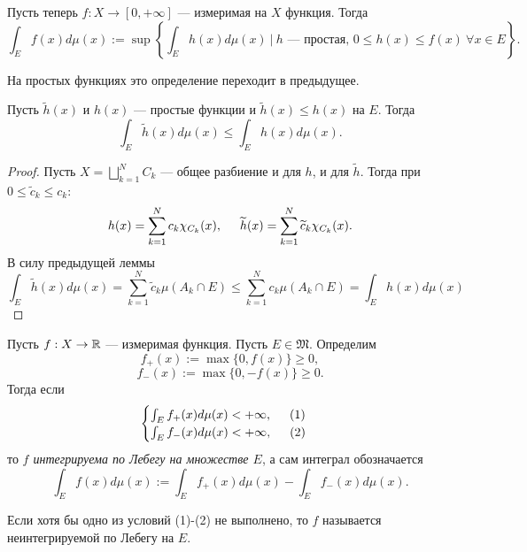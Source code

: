 \begin{definition}
    Пусть теперь $f: X \to [0, +\infty]$ — измеримая на $X$ функция.
    Тогда
    \[\int_E f(x) d\mu(x) := \sup \left\{\int_E h(x) d\mu(x) \ | \ h \text{ — простая, } 0 \leqslant h(x) \leqslant f(x) \ \forall x \in E\right\}.\]
\end{definition} 
\begin{remark}
    На простых функциях это определение переходит в предыдущее.
\end{remark}
\begin{statement}
    Пусть $\widetilde{h}(x)$ и $h(x)$ — простые функции и
    $\widetilde{h}(x) \leqslant h(x)$ на $E$.
    Тогда $$\int_E \widetilde{h}(x) d\mu(x) \leqslant \int_E h(x) d\mu(x).$$
\end{statement} 
\begin{proof}
    Пусть $X = \bigsqcup\limits_{k=1}^{N}C_k$ — общее разбиение и для $h$, и для $\widetilde{h}$.
    Тогда при $0 \leqslant \widetilde{c}_k \leqslant c_k$:
    \[h(x) = \sum\limits_{k=1}^{N} c_k \chi_{C_k}(x), \hspace*{.5cm} \widetilde{h}(x) = \sum\limits_{k=1}^{N} \widetilde{c}_k \chi_{C_k}(x).\]
    В силу предыдущей леммы
    \[\int_E \widetilde{h}(x) d\mu(x) 
    = \sum\limits_{k=1}^{N}\widetilde{c}_k \mu(A_k \cap E)
    \leqslant \sum\limits_{k=1}^{N} c_k \mu(A_k \cap E)
    = \int_E h(x) d\mu(x)\]
\end{proof} 

\begin{definition}
    Пусть $f: X \to \mathbb{R}$ — измеримая функция.
    Пусть $E \in \mathfrak{M}$.
    Определим
    \[f_+(x) := \max\{0, f(x)\} \geqslant 0,\]
    \[f_-(x) := \max\{0, -f(x)\} \geqslant 0.\]
    Тогда если 
    \[\begin{cases}
        \int_E f_+(x) d\mu(x) < +\infty, \hspace*{.5cm} (1)\\
        \int_E f_-(x) d\mu(x) < +\infty, \hspace*{.5cm} (2)
    \end{cases}
    \]
    то \textit{$f$ интегрируема по Лебегу на множестве $E$}, а сам интеграл обозначается
    \[\int_E f(x) d\mu(x) := \int_E f_+(x) d\mu(x) - \int_E f_-(x) d\mu(x).\]
\end{definition} 
\begin{remark}
    Если хотя бы одно из условий (1)-(2) не выполнено, то $f$ называется неинтегрируемой по Лебегу на $E$.
\end{remark}

